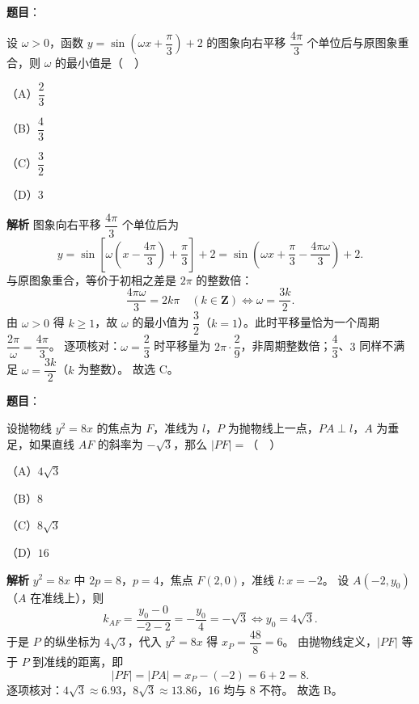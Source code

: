 \begin{answer}

\textbf{题目}：

设 $\omega>0$，函数 $y=\sin\left(\omega x+\dfrac{\pi}{3}\right)+2$ 的图象向右平移 $\dfrac{4\pi}{3}$ 个单位后与原图象重合，则 $\omega$ 的最小值是（　）

（A）$\dfrac23$

（B）$\dfrac43$

（C）$\dfrac32$

（D）$3$

\textbf{解析}
图象向右平移 $\dfrac{4\pi}{3}$ 个单位后为
\nopagebreak[4]
\[y=\sin\left[\omega\left(x-\frac{4\pi}{3}\right)+\frac{\pi}{3}\right]+2
=\sin\left(\omega x+\frac{\pi}{3}-\frac{4\pi\omega}{3}\right)+2.\]
与原图象重合，等价于初相之差是 $2\pi$ 的整数倍：
\nopagebreak[4]
\[\frac{4\pi\omega}{3}=2k\pi\quad(k\in\mathbf Z)\iff\omega=\frac{3k}{2}.\]
由 $\omega>0$ 得 $k\geqslant1$，故 $\omega$ 的最小值为 $\dfrac32$（$k=1$）。此时平移量恰为一个周期 $\dfrac{2\pi}{\omega}=\dfrac{4\pi}{3}$。
逐项核对：$\omega=\dfrac23$ 时平移量为 $2\pi\cdot\dfrac{2}{9}$，非周期整数倍；$\dfrac43$、$3$ 同样不满足 $\omega=\dfrac{3k}{2}$（$k$ 为整数）。
故选 C。


\end{answer}
\begin{answer}

\textbf{题目}：

设抛物线 $y^2=8x$ 的焦点为 $F$，准线为 $l$，$P$ 为抛物线上一点，$PA\perp l$，$A$ 为垂足，如果直线 $AF$ 的斜率为 $-\sqrt3$，那么 $|PF|=$（　）

（A）$4\sqrt3$

（B）$8$

（C）$8\sqrt3$

（D）$16$

\textbf{解析}
$y^2=8x$ 中 $2p=8$，$p=4$，焦点 $F(2,0)$，准线 $l:x=-2$。
设 $A(-2,y_0)$（$A$ 在准线上），则
\nopagebreak[4]
\[k_{AF}=\frac{y_0-0}{-2-2}=-\frac{y_0}{4}=-\sqrt3\iff y_0=4\sqrt3.\]
于是 $P$ 的纵坐标为 $4\sqrt3$，代入 $y^2=8x$ 得 $x_P=\dfrac{48}{8}=6$。
由抛物线定义，$|PF|$ 等于 $P$ 到准线的距离，即
\nopagebreak[4]
\[|PF|=|PA|=x_P-(-2)=6+2=8.\]
逐项核对：$4\sqrt3\approx6.93$，$8\sqrt3\approx13.86$，$16$ 均与 $8$ 不符。
故选 B。


\end{answer}
